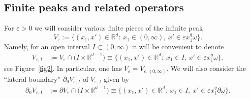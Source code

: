 \documentclass[11pt,oneside,reqno,a4paper]{amsart}
\newcommand{\R}{\mathbb{R}}
\newcommand{\eps}{\varepsilon}
\theoremstyle{definition}
\begin{document}
\subsection{Finite peaks and related operators}\label{secpeak} For $\eps>0$ we will consider various finite pieces of the infinite peak
\[
V_\eps:=\Big\{(x_1,x')\in\R^d:\ x_1\in(0,\infty),\ x'\in \eps x_1^q\omega\Big\}.
\]
Namely, for an open interval $I\subset(0,\infty)$ 
it will be convenient to denote
\begin{align*}
	V_{\eps,I}&:= V_\eps \cap\Big( I\times\R^{d-1}\Big)
\equiv \Big\{(x_1,x')\in\R^d:\ x_1\in I,\ x'\in \eps x_1^q\omega\Big\},
\end{align*}
see Figure~\ref{fig2}.
In particular, one has $V_\eps=V_{\eps,(0,\infty)}$. We will also consider the ``lateral boundary'' $\partial_0 V_{\eps,I}$ of $V_{\eps,I}$ given by
\begin{align*}
	\partial_0V_{\eps,I}&:= \partial V_\eps \cap\Big( I\times\R^{d-1}\Big)
	\equiv \Big\{(x_1,x')\in\R^d:\ x_1\in I,\ x'\in \eps x_1^q\partial\omega\Big\}.
\end{align*}
\end{document}
